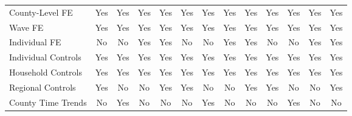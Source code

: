 \begin{tabular}{l*{1}cccccccccccc}
County-Level FE&         Yes         &         Yes         &         Yes         &         Yes         &         Yes         &         Yes         &         Yes         &         Yes         &         Yes         &         Yes         &         Yes       
 &         Yes         \\
Wave FE     &         Yes         &         Yes         &         Yes         &         Yes         &         Yes         &         Yes         &         Yes         &         Yes         &         Yes         &         Yes         &         Yes         &
        Yes         \\
Individual FE&          No         &          No         &         Yes         &         Yes         &          No         &          No         &         Yes         &         Yes         &          No         &          No &         Yes         
&         Yes         \\
Individual Controls&         Yes         &         Yes         &         Yes         &         Yes         &     Yes         &         Yes         &         Yes         &         Yes         &         Yes         &         Yes         &         Yes   
     &         Yes         \\
Household Controls&         Yes         &         Yes         &         Yes         &         Yes         &      Yes         &         Yes         &         Yes         &         Yes         &         Yes         &         Yes         &         Yes    
    &         Yes         \\
Regional Controls&         Yes         &          No         &          No         &         Yes         &       Yes         &          No         &          No         &         Yes         &         Yes         &          No         &          No     
   &         Yes         \\
County Time Trends&          No         &         Yes         &          No         &          No         &      No         &         Yes         &          No         &          No         &          No         &         Yes &          No    
    &          No         \\
\bottomrule
\end{tabular}